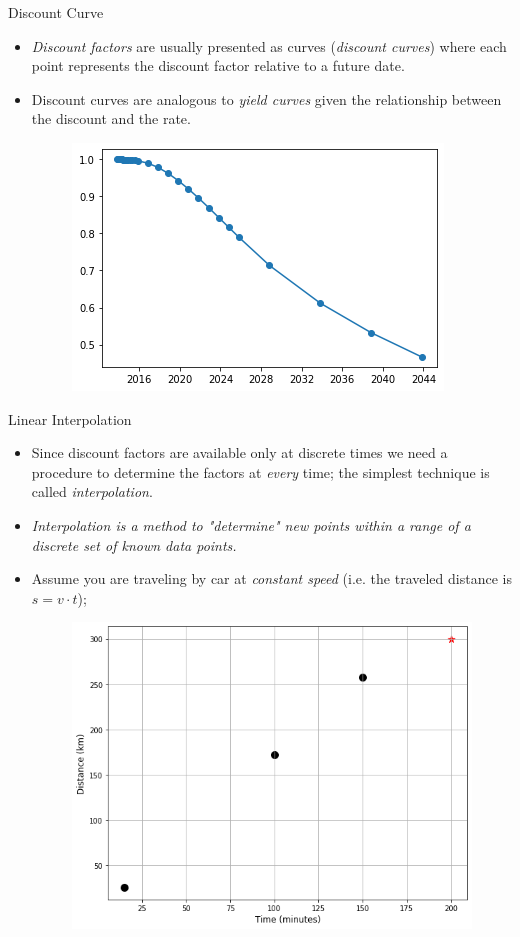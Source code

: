 \documentclass{beamer}
\begin{document}
\begin{frame}{Discount Curve}
  \begin{itemize}
  \item \emph{Discount factors} are usually presented as curves (\emph{discount curves}) where each point represents the discount factor relative to a future date.
  \item Discount curves are analogous to \emph{yield curves} given the relationship between the discount and the rate.
    \begin{figure}[h]
      \begin{center}
        \includegraphics[width=0.55\linewidth]{discount_curve}
      \end{center}
    \end{figure}
  \end{itemize}
\end{frame}

\begin{frame}{Linear Interpolation}
  \begin{itemize}
  \item Since discount factors are available only at discrete times we need a procedure to determine the factors at \emph{every} time; the simplest technique is called \emph{interpolation}.
  \item \emph{Interpolation is a method to "determine" new points within a range of a discrete set of known data points.}
  \item Assume you are traveling by car at \emph{constant speed} (i.e. the traveled distance is $s = v \cdot t$);
    \begin{figure}[h]
      \begin{center}
        \includegraphics[width=0.45\linewidth]{interp1}
      \end{center}
    \end{figure}
  \end{itemize}
\end{frame}
\end{document}
